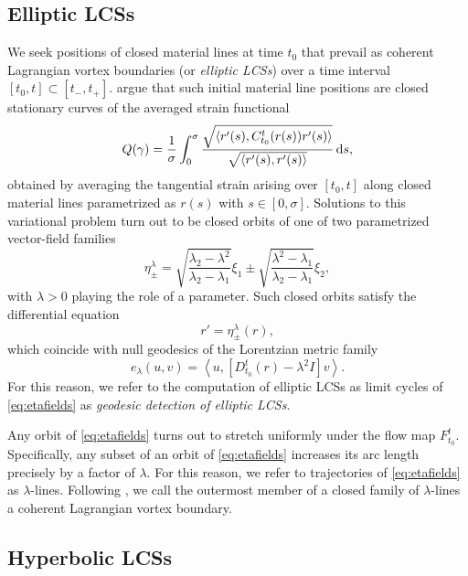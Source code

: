 \documentclass[5p]{elsarticle}
\begin{document}
\subsection{Elliptic LCSs}
\label{sec:Elliptic LCSs}

We seek positions of closed material lines at time $t_0$ that prevail as coherent Lagrangian vortex boundaries (or \emph{elliptic LCSs}) over a time interval $[t_0,t]\subset[t_-,t_+]$. \citet{haller13:_coher_lagran,haller14:_adden_coher_lagran} argue that such initial material line positions are closed stationary curves of the averaged strain functional
\[
Q(\gamma) = \frac{1}{\sigma} \int_0^\sigma \frac{\sqrt{\langle r'(s),C_{t_0}^t(r(s))r'(s)\rangle}}{\sqrt{\langle r'(s),r'(s)\rangle}} \dif s,
\]
obtained by averaging the tangential strain arising over $[t_0,t]$ along closed material lines parametrized as $r(s)$ with $s \in [0,\sigma].$
Solutions to this variational problem turn out to be closed orbits of one of two parametrized vector-field families
\begin{equation}
\eta_\pm^\lambda = \sqrt{\frac{\lambda_2 - \lambda^2}{\lambda_2 - \lambda_1}} \xi_1 \pm \sqrt{\frac{\lambda^2 - \lambda_1}{\lambda_2 - \lambda_1}}\xi_2,
\label{eq:eta}
\end{equation}
with $\lambda > 0$ playing the role of a parameter. Such closed orbits satisfy the differential equation
\begin{equation}
r' = \eta_\pm^\lambda(r),
\label{eq:etafields}
\end{equation}
which coincide with null geodesics of the Lorentzian metric family
\[
e_\lambda(u,v) = \left\langle u,\left[D_{t_0}^t(r) - \lambda^2 I\right] v \right\rangle.
\]
For this reason, we refer to the computation of elliptic LCSs as limit cycles of \cref{eq:etafields} as \emph{geodesic detection of elliptic LCSs}.

Any orbit of \cref{eq:etafields} turns out to stretch uniformly under the flow map $F_{t_0}^t$. Specifically, any subset of an orbit of \cref{eq:etafields} increases its arc length precisely by a factor of $\lambda$. For this reason, we refer to trajectories of \cref{eq:etafields} as $\lambda$-lines. Following \citet{haller13:_coher_lagran,haller14:_adden_coher_lagran}, we call the outermost member of a closed family of $\lambda$-lines a coherent Lagrangian vortex boundary.

\subsection{Hyperbolic LCSs}
\label{sec:Hyperbolic LCSs}
\end{document}
